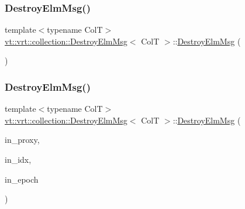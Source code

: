 \subsubsection{\texorpdfstring{Destroy\+Elm\+Msg()}{DestroyElmMsg()}\hspace{0.1cm}{\footnotesize\ttfamily [1/2]}}
{\footnotesize\ttfamily template$<$typename ColT$>$ \\
\hyperlink{structvt_1_1vrt_1_1collection_1_1_destroy_elm_msg}{vt\+::vrt\+::collection\+::\+Destroy\+Elm\+Msg}$<$ ColT $>$\+::\hyperlink{structvt_1_1vrt_1_1collection_1_1_destroy_elm_msg}{Destroy\+Elm\+Msg} (\begin{DoxyParamCaption}{ }\end{DoxyParamCaption})\hspace{0.3cm}{\ttfamily [default]}}

\mbox{\label{structvt_1_1vrt_1_1collection_1_1_destroy_elm_msg_a837873a189d4267f599ec975d2cde6f2}} 
\subsubsection{\texorpdfstring{Destroy\+Elm\+Msg()}{DestroyElmMsg()}\hspace{0.1cm}{\footnotesize\ttfamily [2/2]}}
{\footnotesize\ttfamily template$<$typename ColT$>$ \\
\hyperlink{structvt_1_1vrt_1_1collection_1_1_destroy_elm_msg}{vt\+::vrt\+::collection\+::\+Destroy\+Elm\+Msg}$<$ ColT $>$\+::\hyperlink{structvt_1_1vrt_1_1collection_1_1_destroy_elm_msg}{Destroy\+Elm\+Msg} (\begin{DoxyParamCaption}\item[{\hyperlink{namespacevt_a1b417dd5d684f045bb58a0ede70045ac}{Virtual\+Proxy\+Type}}]{in\+\_\+proxy,  }\item[{typename Col\+T\+::\+Index\+Type}]{in\+\_\+idx,  }\item[{\hyperlink{namespacevt_a81d11b28122d43bf9834577e4a06440f}{Epoch\+Type}}]{in\+\_\+epoch }\end{DoxyParamCaption})\hspace{0.3cm}{\ttfamily [inline]}}



